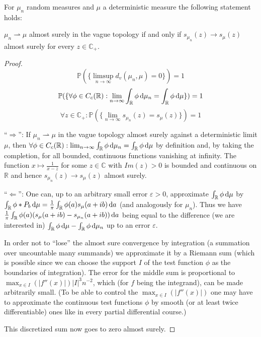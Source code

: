 \begin{theorem}
	For $\mu_n$ random measures and $\mu$ a deterministic measure the following statement holds:
	
	$\mu_n\rightharpoonup\mu$ almost surely in the vague topology if and only if $s_{\mu_n}(z)\rightarrow s_\mu(z)$ almost surely for every $z\in\mathbb C_+$.
\end{theorem}

\begin{proof}
	$$\mathbb P(\{\limsup_{n\rightarrow\infty}d_v(\mu_n,\mu)=0\})=1$$
	$$\mathbb P(\{\forall \phi\in C_c(\mathbb R): \lim_{n\rightarrow\infty}\int_\mathbb{R}\phi \mathop{}\!\mathrm{d}\mu_n=\int_\mathbb{R}\phi \mathop{}\!\mathrm{d}\mu\})=1$$
	$$\forall z\in\mathbb C_+:\mathbb P(\{\lim_{n\rightarrow\infty} s_{\mu_n}(z)=s_\mu(z)\})=1$$

	``$\Rightarrow$'': If $\mu_n\rightharpoonup\mu$ in the vague topology almost surely against a deterministic limit $\mu$, then $\forall \phi\in C_c(\mathbb R): \lim_{n\rightarrow\infty}\int_\mathbb{R}\phi \mathop{}\!\mathrm{d}\mu_n=\int_\mathbb{R}\phi \mathop{}\!\mathrm{d}\mu$ by definition and, by taking the completion, for all bounded, continuous functions vanishing at infinity. The function $x\mapsto \frac{1}{x-z}$ for some $z\in\mathbb C$ with $Im(z)>0$ is bounded and continuous on $\mathbb R$ and hence $s_{\mu_n}(z)\rightarrow s_\mu(z)$ almost surely.
	
	``$\Leftarrow$'': One can, up to an arbitrary small error $\varepsilon>0$, approximate $\int_\mathbb{R}\phi\mathop{}\!\mathrm{d}\mu$ by $\int_\mathbb{R}\phi*P_b \mathop{}\!\mathrm{d}\mu = \frac{1}{\pi}\int_\mathbb{R}\phi(a)s_\mu(a+ib)\mathop{}\!\mathrm{d} a$ (and analogously for $\mu_n$).
	Thus we have $\frac{1}{\pi}\int_\mathbb{R}\phi(a)(s_\mu(a+ib)-s_{\mu_n}(a+ib))\mathop{}\!\mathrm{d} a$ being equal to the difference (we are interested in) $\int_\mathbb{R}\phi\mathop{}\!\mathrm{d}\mu - \int_\mathbb{R}\phi\mathop{}\!\mathrm{d}\mu_n$ up to an error $\varepsilon$.
	
	In order not to ``lose'' the almost sure convergence by integration (a summation over uncountable many summands) we approximate it by a Riemann sum (which is possible since we can choose the support $I$ of the test function $\phi$ as the boundaries of integration). The error for the middle sum is proportional to $\max_{x\in I}(|f''(x)|)|I|^3 n^{-2}$, which (for $f$ being the integrand), can be made arbitrarily small. (To be able to control the $\max_{x\in I}(|f''(x)|)$ one may have to approximate the continuous test functions $\phi$ by smooth (or at least twice differentiable) ones like in every partial differential course.)
	
	This discretized sum now goes to zero almost surely.
\end{proof}

